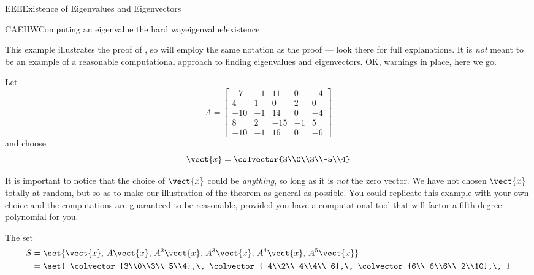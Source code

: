 \begin{subsect}{EEE}{Existence of Eigenvalues and Eigenvectors}
\begin{example}{CAEHW}{Computing an eigenvalue the hard way}{eigenvalue!existence}
%
\begin{para}This example illustrates the proof of , so will employ the same notation as the proof --- look there for full explanations.  It is {\em not} meant to be an example of a reasonable computational approach to finding eigenvalues and eigenvectors.  OK, warnings in place, here we go.\end{para}
%
\begin{para}Let
%
\begin{equation*}
A=\begin{bmatrix}
-7 & -1 & 11 & 0 & -4\\
4 & 1 & 0 & 2 & 0\\
-10 & -1 & 14 & 0 & -4\\
8 & 2 & -15 & -1 & 5\\
-10 & -1 & 16 & 0 & -6
\end{bmatrix}
\end{equation*}
%
and choose
%
\begin{equation*}
\vect{x}=\colvector{3\\0\\3\\-5\\4}
\end{equation*}
\end{para}
%
\begin{para}It is important to notice that the choice of $\vect{x}$ could be {\em anything}, so long as it is {\em not} the zero vector.  We have not chosen $\vect{x}$ totally at random, but so as to make our illustration of the theorem as general as possible.  You could replicate this example with your own choice and the computations are guaranteed to be reasonable, provided you have a computational tool that will factor a fifth degree polynomial for you.\end{para}
%
\begin{para}The set
%
\begin{align*}
S&=\set{\vect{x},\,A\vect{x},\,A^2\vect{x},\,A^3\vect{x},\,A^4\vect{x},\,A^5\vect{x}}\\
&=
\set{
\colvector{3\\0\\3\\-5\\4},\,
\colvector{-4\\2\\-4\\4\\-6},\,
\colvector{6\\-6\\6\\-2\\10},\,
}
\end{align*}
\end{para}
\end{example}
\end{subsect}
